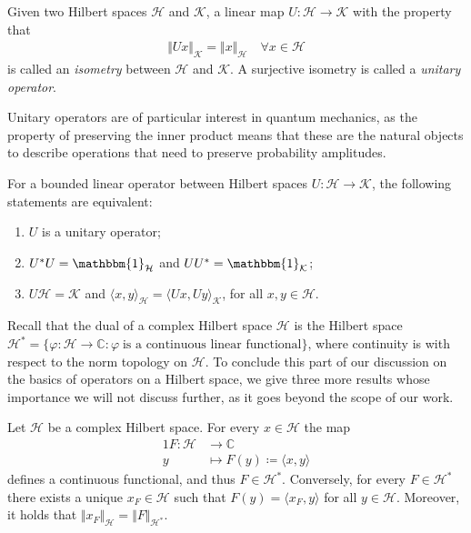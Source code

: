 \begin{appendices}
\begin{definition}
	Given two Hilbert spaces $\mathcal{H}$ and $\mathcal{K}$, a linear map $U:\mathcal{H}\to\mathcal{K}$
	with the property that
	\begin{align*}
		\Vert Ux\Vert_{\mathcal{K}} = \Vert x\Vert_{\mathcal{H}}\quad\forall x\in\mathcal{H}
	\end{align*}
	is called an \textit{isometry} between $\mathcal{H}$ and $\mathcal{K}$. A surjective
	isometry is called a \textit{unitary operator}.
\end{definition}

Unitary operators are of particular interest in quantum mechanics, as the property of
preserving the inner product means that these are the natural objects to describe operations
that need to preserve probability amplitudes.

\begin{proposition}
	For a bounded linear operator between Hilbert spaces $U:\mathcal{H}\to\mathcal{K}$, the
	following statements are equivalent:
	\begin{enumerate}
		\item[a)] $U$ is a unitary operator;
		\item[b)] $U^*U = \mathbbm{1}_{\mathcal{H}}$ and $UU^* = \mathbbm{1}_{\mathcal{K}}$;
		\item[c)] $U\mathcal{H}=\mathcal{K}$ and $\langle x,y\rangle_{\mathcal{H}}=\langle Ux,Uy\rangle_{\mathcal{K}}$, for all $x,y\in\mathcal{H}$.
	\end{enumerate}
\end{proposition}

Recall that the dual of a complex Hilbert space $\mathcal{H}$ is the Hilbert space
$\mathcal{H}^* = \{\varphi:\mathcal{H}\to\mathbb{C} : \varphi\;\text{is a continuous linear
functional}\}$, where continuity is with respect to the norm topology on $\mathcal{H}$. To
conclude this part of our discussion on the basics of operators on a Hilbert space, we give
three more results whose importance we will not discuss further, as it goes beyond the scope
of our work.

\begin{theorem}
	\label{thm:riesz}
	Let $\mathcal{H}$ be a complex Hilbert space. For every $x\in\mathcal{H}$ the map
	\begin{alignat*}{1}
		F : \mathcal{H} &\longrightarrow \mathbb{C}\\
			y &\longmapsto F(y) \coloneq \langle x,y \rangle
	\end{alignat*}
	defines a continuous functional, and thus $F\in\mathcal{H}^*$. Conversely, for every $F\in
	\mathcal{H}^*$ there exists a unique $x_F\in\mathcal{H}$ such that $F(y)=\langle x_F,y
	\rangle$ for all $y\in\mathcal{H}$. Moreover, it holds that $\Vert x_F\Vert_{\mathcal{H}}=
	\Vert F\Vert_{\mathcal{H}^*}$.
\end{theorem}


\end{appendices}
